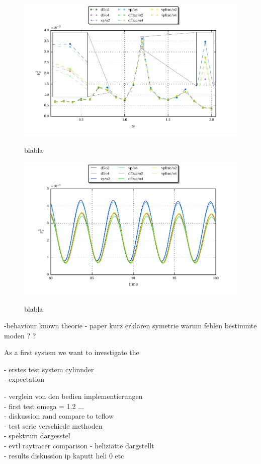 \begin{figure}[!pt]
  \centering
  \includegraphics{gfx/cone/cylinder/cylinder.pdf}\label{fig:cone:cyl}
  \caption{blabla}

  \includegraphics{gfx/cone/cylinder/cyl_vz.pdf}\label{fig:cone:cyl_time}
  \caption{blabla}
\end{figure}
\newpage

-behaviour known theorie
- paper kurz erklären symetrie warum fehlen bestimmte moden ? ?

As a first system we want to investigate the

- erstes test system cylinnder\\
- expectation

- verglein von den bedien implementierungen\\
- first test omega = 1.2 ...\\
- diskussion rand compare to tcflow \\
- test serie verschiede methoden\\
- spektrum dargesstel\\
- evtl raytracer  comparison
- heliziätte dargstellt\\
- results diskussion ip kaputt heli 0 etc \\
